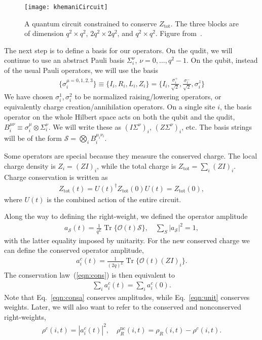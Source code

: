 \documentclass[a4paper,11pt]{article}
\renewcommand{\cal}{\mathcal}
\renewcommand{\th}[1]{\frac{1}{#1}}
\newcommand{\abs}[1]{\left| #1 \right|}
\renewcommand{\S}{\mathcal{S}}
\newcommand{\nc}{\text{nc}}
\newcommand{\tot}{\text{tot}}
\DeclareMathOperator{\Tr}{Tr}
\begin{document}
\begin{figure}
	\centering
	\texttt{[image: khemaniCircuit]}
	\caption{A quantum circuit constrained to conserve $Z_\tot$. The three blocks are of dimension $q^2\times q^2$, $2q^2\times 2q^2$, and $q^2\times q^2$. Figure from~\cite{KhemaniOpSp}.}
	\label{fig:khemaniCircuit}
\end{figure}

The next step is to define a basis for our operators. On the qudit, we will continue to use an abstract Pauli basis $\Sigma_i^\nu$, $\nu=0,\dots,q^2-1$. On the qubit, instead of the usual Pauli operators, we will use the basis~\cite{KhemaniOpSp}
\begin{align}
\{\sigma_i^{\mu=0,1,2,3}\} \equiv \{I_i, R_i, L_i,Z_i\}=\{I_i,\frac{\sigma_i^+}{\sqrt{2}}, \frac{\sigma_i^-}{\sqrt{2}}, \sigma_i^z\}
\end{align}
We have chosen $\sigma_i^1, \sigma_i^2$ to be normalized raising/lowering operators, or equivalently charge creation/annihilation operators. On a single site $i$, the basis operator on the whole Hilbert space acts on both the qubit and the qudit, $B_i^{\mu\nu} \equiv \sigma_i^\mu \otimes \Sigma_i^\nu$. We will write these as $(I\Sigma^\nu)_i$, $(Z\Sigma^\nu)_i$, etc. The basis strings will be of the form $\S=\bigotimes_iB_i^{\mu_i\nu_i}$.

Some operators are special because they measure the conserved charge. The local charge density is $Z_i=(ZI)_i$, while the total charge is $Z_\tot=\sum_i(ZI)_i$. Charge conservation is written as 
\begin{align}
Z_\tot(t) = U(t)^\dag Z_\tot(0)U(t) = Z_\tot(0), \label{eqn:cons}
\end{align}
where $U(t)$ is the combined action of the entire circuit.

Along the way to defining the right-weight, we defined the operator amplitude
\begin{align}
a_\S(t) = \th{q^L}\Tr\{ \cal{O}(t)\S \},\quad \sum_S\abs{a_\S}^2 = 1, \label{eqn:unit}
\end{align}
with the latter equality imposed by unitarity. For the new conserved charge we can define the conserved operator amplitude,
\begin{align}
a_i^c(t) = \th{(2q)^{L}}\Tr\{\cal{O}(t)(ZI)_i\}.
\end{align}
The conservation law~(\ref{eqn:cons}) is then equivalent to 
\begin{align}
\sum_i a_i^c(t)=\sum_i a_i^c(0). \label{eqn:consa}
\end{align}
Note that Eq.~\ref{eqn:consa} conserves amplitudes, while Eq.~\ref{eqn:unit} conserves weights. Later, we will also want to refer to the conserved and nonconserved right-weights, 
\begin{align}
\rho^c(i,t) = \abs{a^c_i(t)}^2, \quad \rho_R^\nc(i,t) = \rho_R(i,t)- 
	\rho^c(i,t).
\end{align}
\end{document}
